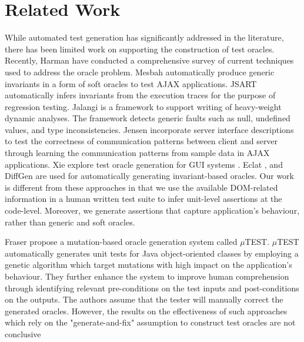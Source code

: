 \section{Related Work} \label{Sec:related}
While automated test generation has significantly addressed in the literature, there has been limited work on supporting the construction of test oracles. Recently, Harman \etal \cite{harman:tech13} have conducted a comprehensive survey of current techniques used to address the oracle problem.
Mesbah \etal \cite{mesbah:tse12} automatically produce generic invariants in a form of soft oracles to test AJAX applications. JSART \cite{mirshokraie:icwe12} automatically infers \javascript invariants from the execution traces for the purpose of regression testing. Jalangi \cite{sen:fse13} is a framework to support writing of heavy-weight dynamic analyses. The framework detects generic \javascript faults such as null, undefined values, and type inconsistencies. Jensen \etal \cite{jensen:fse13} incorporate server interface descriptions to test the correctness of communication patterns between client and server through learning the communication patterns from sample data in AJAX applications.
Xie \etal explore test oracle generation for GUI systems \cite{xie:tosem07}. 
Eclat \cite{pacheco:ecoop05}, and DiffGen \cite{taneja:ase08} are used for automatically generating invariant-based oracles. 
Our work is different from these approaches in that we use the available DOM-related information in a human written test suite to infer unit-level assertions at the \javascript code-level. Moreover, we generate assertions that capture application's behaviour, rather than generic and soft oracles. 

Fraser \etal \cite{fraser:tse12} propose a mutation-based oracle generation system called $\mu$TE\-ST. $\mu$TE\-ST automatically generates unit tests for Java object-oriented classes by employing a genetic algorithm which target mutations with high impact on the application's behaviour. They further enhance the system \cite{fraser:issta11} to improve human comprehension through identifying relevant pre-conditions on the test inputs and post-conditions on the outputs. The authors assume that the tester will manually correct the generated oracles. However, the results on the effectiveness of such approaches which rely on the "generate-and-fix" assumption to construct test oracles are not conclusive \cite{fraser:issta13}

